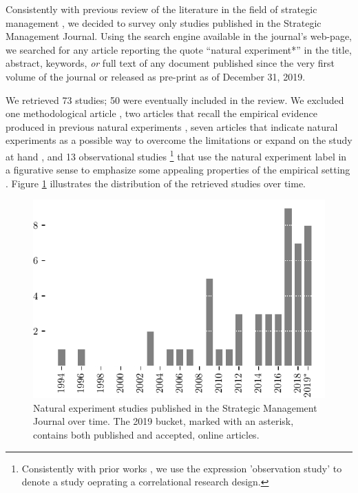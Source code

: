 \documentclass[11pt, english]{article}
\begin{document}

\noindent  Consistently with previous review of the literature in the field of
strategic management \parencite[e.g.][]{Haans2015}, we decided to survey only
studies published in the Strategic Management Journal.  Using the search engine
available in the journal's web-page, we searched for any article reporting the
quote ``natural experiment*'' in the title, abstract, keywords, \emph{or} full
text of any document published since the very first volume of the journal or
released as pre-print as of December 31, 2019.

We retrieved 73 studies; 50 were eventually included in the review. We excluded
one methodological article \parencite[][]{Semadeni2014}, two articles that
recall the empirical evidence produced in previous natural experiments
\parencite[][]{Gallus2016,Chakrabarti2015}, seven articles that indicate natural
experiments as a possible way to overcome the limitations or expand on the study
at hand \parencite[e.g.][]{Karim2012}, and 13 observational studies
\footnote{Consistently with prior works \parencite[][]{Dunning2012,Sieweke2019},
we use the expression 'observation study' to denote a study oeprating a
correlational research design.} that use the natural experiment label in a
figurative sense to emphasize some appealing properties of the empirical setting
\parencite[][]{Grigoriou2017}. Figure \ref{fig:studies_over_time} illustrates
the distribution of the retrieved studies over time.

\begin{figure}[]
    \centering
    \includegraphics{images/studies_over_time.pdf}
    \caption{Natural experiment studies published in the Strategic Management
        Journal over time. The 2019 bucket, marked with an asterisk, contains 
        both published and accepted, online articles.}
    \label{fig:studies_over_time}
\end{figure}
\end{document}
